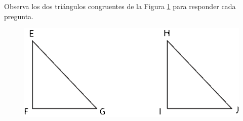 Observa los dos triángulos congruentes de la Figura \ref{fig:congruencia03}  para responder cada pregunta.

\begin{minipage}{0.5\textwidth}
\end{minipage}%
\begin{minipage}{0.5\textwidth}
    \begin{figure}[H]
        \centering
        \includegraphics[width=\linewidth]{../images/congruencia03}
        \caption{}
        \label{fig:congruencia03}
    \end{figure}
\end{minipage}